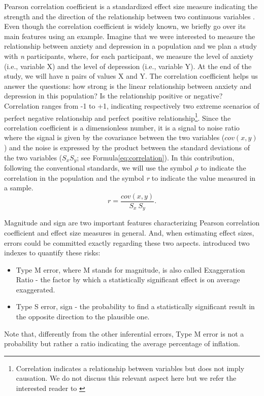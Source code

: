 \documentclass{article}\usepackage[]{graphicx}\usepackage[]{color}
\begin{document}
Pearson correlation coefficient is a standardized effect size measure indicating the strength and the direction of the relationship between two continuous variables \parencite{cohenStatisticalPowerAnalysis1988, ellisEssentialGuideEffect2010}. Even though the correlation coefficient is widely known, we briefly go over its main features using an example. Imagine that we were interested to measure the relationship between anxiety and depression in a population and we plan a study with \emph{n} participants, where, for each participant, we measure the level of anxiety (i.e., variable X) and the level of depression (i.e., variable Y). At the end of the study, we will have n pairs of values X and Y. The correlation coefficient helps us answer the questions: how strong is the linear relationship between anxiety and depression in this population? Is the relationship positive or negative? Correlation ranges from -1 to +1, indicating respectively two extreme scenarios of perfect negative relationship and perfect positive relationship\footnote{Correlation indicates a relationship between variables but does not imply causation. We do not discuss
this relevant aspect here but we refer the interested reader to \parencite{rohrerThinkingClearlyCorrelations2018}}. Since the correlation coefficient is a dimensionless number, it is a signal to noise ratio where the signal is given by the covariance between the two variables ($cov(x,y)$) and the noise is expressed by the product between the standard deviations of the two variables ($S_x  S_y$; see Formula\ref{eq:correlation}). In this contribution, following the conventional standards, we will use the symbol $\rho$ to indicate the correlation in the population and the symbol \emph{r} to indicate the value measured in a sample.
\begin{equation}
\label{eq:correlation}
r=\frac{cov(x,y)}{S_x\ S_y}.
\end{equation}


Magnitude and sign are two important features characterizing Pearson correlation coefficient and effect size measures in general. And, when estimating effect sizes, errors could be committed exactly regarding these two aspects. \textcite{gelmanPowerCalculationsAssessing2014} introduced two indexes to quantify these risks:
\begin{itemize}
  \item{Type M error, where M stands for magnitude, is also called Exaggeration Ratio - the factor by which a statistically significant effect is on average exaggerated.}
  \item{Type S error, sign - the probability to find a statistically significant result in the opposite direction to the plausible one.}
\end{itemize}
Note that, differently from the other inferential errors, Type M error is not a probability but rather a ratio indicating the average percentage of inflation.
\end{document}
